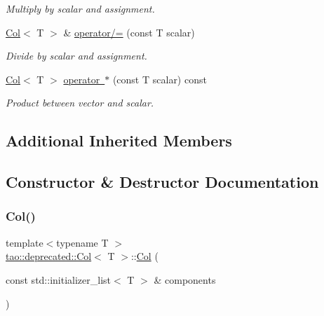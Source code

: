 \begin{DoxyCompactItemize}
\begin{DoxyCompactList}\small\item\em Multiply by scalar and assignment. \end{DoxyCompactList}\item 
\mbox{\hyperlink{classtao_1_1deprecated_1_1_col}{Col}}$<$ T $>$ \& \mbox{\hyperlink{classtao_1_1deprecated_1_1_col_a0d3991ffc0e7f3859bfa19cb2e125062}{operator/=}} (const T scalar)
\begin{DoxyCompactList}\small\item\em Divide by scalar and assignment. \end{DoxyCompactList}\item 
\mbox{\hyperlink{classtao_1_1deprecated_1_1_col}{Col}}$<$ T $>$ \mbox{\hyperlink{classtao_1_1deprecated_1_1_col_aa5aaea7c660cbe4423f3656544d6a295}{operator $\ast$}} (const T scalar) const
\begin{DoxyCompactList}\small\item\em Product between vector and scalar. \end{DoxyCompactList}\end{DoxyCompactItemize}
\subsection*{Additional Inherited Members}


\subsection{Constructor \& Destructor Documentation}
\mbox{\label{classtao_1_1deprecated_1_1_col_a71db20226883e22a687cebe7d590cf6d}} 
\subsubsection{\texorpdfstring{Col()}{Col()}}
{\footnotesize\ttfamily template$<$typename T $>$ \\
\mbox{\hyperlink{classtao_1_1deprecated_1_1_col}{tao\+::deprecated\+::\+Col}}$<$ T $>$\+::\mbox{\hyperlink{classtao_1_1deprecated_1_1_col}{Col}} (\begin{DoxyParamCaption}\item[{const std\+::initializer\+\_\+list$<$ T $>$ \&}]{components }\end{DoxyParamCaption})}



